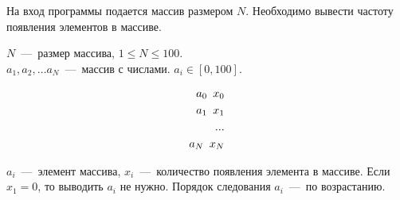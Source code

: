 На вход программы подается массив размером $N$. Необходимо вывести частоту появления элементов в массиве.
\InputFile

\noindent
$N$~---~размер массива, $1 \leq N \leq 100$. \\
$a_1, a_2, \ldots a_N$~---~массив с числами. $ a_i \in [0, 100]$. 

\OutputFile

\begin{align*}
	a_0 \enskip x_0 \\
	a_1 \enskip x_1 \\
	... \\
	a_N \enskip x_N \\
\end{align*}

$a_i$~---~элемент массива, $x_i$~---~количество появления элемента в массиве. 
Если $x_1 = 0$, то выводить $a_i$ не нужно. Порядок следования $a_i$~---~по возрастанию.

\SAMPLES

